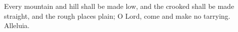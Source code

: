 Every mountain and hill shall be made low, and the crooked shall be made straight, and the rough places plain; O Lord, come and make no tarrying. Alleluia.